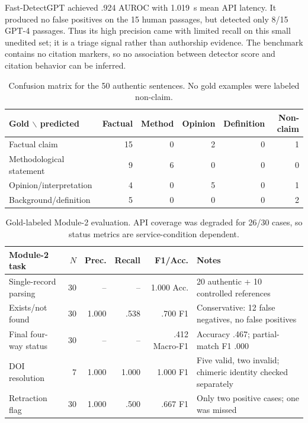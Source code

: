 \documentclass[12pt,toc=bib,toc=listof]{scrartcl}
\begin{document}
Fast-DetectGPT achieved .924 AUROC with 1.019~s mean API latency. It produced no false positives on the 15 human passages, but detected only 8/15 GPT-4 passages. Thus its high precision came with limited recall on this small unedited set; it is a triage signal rather than authorship evidence. The benchmark contains no citation markers, so no association between detector score and citation behavior can be inferred.

\begin{table}[H]
\centering
\scriptsize
\begin{tabular}{@{}lrrrrr@{}}
\toprule
\textbf{Gold $\backslash$ predicted} & \textbf{Factual} & \textbf{Method} & \textbf{Opinion} & \textbf{Definition} & \textbf{Non-claim} \\
\midrule
Factual claim & 15 & 0 & 2 & 0 & 1 \\
Methodological statement & 9 & 6 & 0 & 0 & 0 \\
Opinion/interpretation & 4 & 0 & 5 & 0 & 1 \\
Background/definition & 5 & 0 & 0 & 0 & 2 \\
\bottomrule
\end{tabular}
\caption{Confusion matrix for the 50 authentic sentences. No gold examples were labeled non-claim.}
\label{tab:claim_confusion}
\end{table}

\begin{table}[H]
\centering
\scriptsize
\begin{tabularx}{\textwidth}{@{}P{2.25cm}r r r r Y@{}}
\toprule
\textbf{Module-2 task} & $N$ & \textbf{Prec.} & \textbf{Recall} & \textbf{F1/Acc.} & \textbf{Notes} \\
\midrule
Single-record parsing & 30 & -- & -- & 1.000 Acc. & 20 authentic + 10 controlled references \\
Exists/not found & 30 & 1.000 & .538 & .700 F1 & Conservative: 12 false negatives, no false positives \\
Final four-way status & 30 & -- & -- & .412 Macro-F1 & Accuracy .467; partial-match F1 .000 \\
DOI resolution & 7 & 1.000 & 1.000 & 1.000 F1 & Five valid, two invalid; chimeric identity checked separately \\
Retraction flag & 30 & 1.000 & .500 & .667 F1 & Only two positive cases; one was missed \\
\bottomrule
\end{tabularx}
\caption{Gold-labeled Module-2 evaluation. API coverage was degraded for 26/30 cases, so status metrics are service-condition dependent.}
\label{tab:module2_status}
\end{table}
\end{document}
